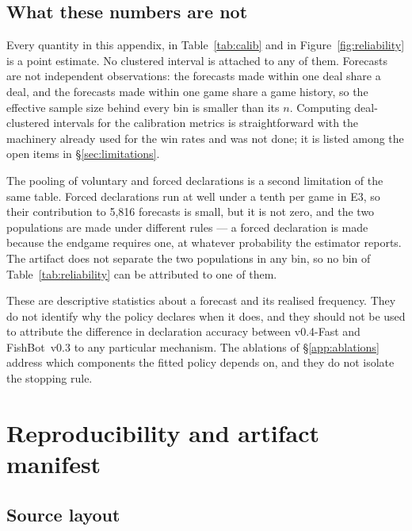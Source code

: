 \documentclass[11pt]{article}
\theoremstyle{definition}
\DeclareRobustCommand{\vfast}{\texorpdfstring{\mbox{v0.4-Fast}}{v0.4-Fast}}
\DeclareRobustCommand{\vthree}{\texorpdfstring{\mbox{FishBot v0.3}}{FishBot v0.3}}
\newcommand{\numDeclN}{5{,}816}
\begin{document}
\subsection{What these numbers are not}
\label{app:calib-caveats}

Every quantity in this appendix, in Table~\ref{tab:calib} and in
Figure~\ref{fig:reliability} is a point estimate. No clustered interval is
attached to any of them. Forecasts are not independent observations: the
forecasts made within one deal share a deal, and the forecasts made within one
game share a game history, so the effective sample size behind every bin is
smaller than its $n$. Computing deal-clustered intervals for the calibration
metrics is straightforward with the machinery already used for the win rates and
was not done; it is listed among the open items in \S\ref{sec:limitations}.

The pooling of voluntary and forced declarations is a second limitation of the
same table. Forced declarations run at well under a tenth per game in E3, so
their contribution to \numDeclN{} forecasts is small, but it is not zero, and
the two populations are made under different rules --- a forced declaration is
made because the endgame requires one, at whatever probability the estimator
reports. The artifact does not separate the two populations in any bin, so no
bin of Table~\ref{tab:reliability} can be attributed to one of them.

These are descriptive statistics about a forecast and its realised frequency.
They do not identify why the policy declares when it does, and they should not
be used to attribute the difference in declaration accuracy between \vfast{} and
\vthree{} to any particular mechanism. The ablations of \S\ref{app:ablations}
address which components the fitted policy depends on, and they do not isolate
the stopping rule.
\section{Reproducibility and artifact manifest}
\label{app:repro}

\subsection{Source layout}
\label{app:repro-source}
\end{document}
